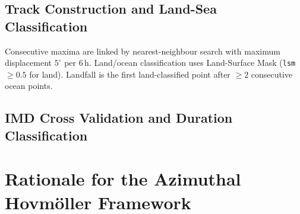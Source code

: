 \subsection{Track Construction and Land-Sea Classification}
\label{subsec:tracking}

Consecutive maxima are linked by nearest-neighbour search with
maximum displacement $5^\circ$ per 6\,h. Land/ocean classification
uses Land-Surface Mask (\texttt{lsm} $\geq 0.5$ for land). Landfall is the first
land-classified point after $\geq 2$ consecutive ocean points.


\subsection{IMD Cross Validation and Duration Classification}
\label{subsec:imd_validation}


\section{Rationale for the Azimuthal Hovm\texorpdfstring{\"{o}}{o}ller Framework}
\label{sec:hovmoller_rationale}

